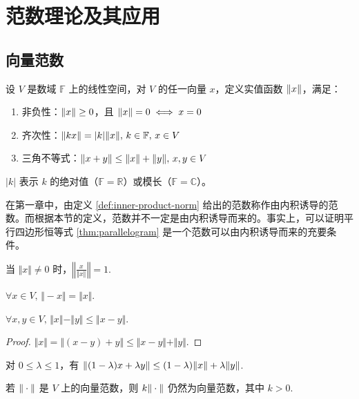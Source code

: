 \section{范数理论及其应用}

\subsection{向量范数}

\begin{definition}[向量范数]
设 $V$ 是数域 $\mathbb F$ 上的线性空间，对 $V$ 的任一向量 $x$，定义实值函数 $\Vert x\Vert$，满足：
\begin{enumerate}
    \item 非负性：$\Vert x\Vert\geq0$，且 $\Vert x\Vert=0\iff x=0$
    \item 齐次性：$\Vert kx\Vert=|k|\Vert x\Vert,\,k\in \mathbb F,\,x\in V$
    \item 三角不等式：$\Vert x+y\Vert\leq\Vert x\Vert+\Vert y\Vert,\,x,y\in V$
\end{enumerate}
\end{definition}
\begin{com}
$|k|$ 表示 $k$ 的绝对值（$\mathbb F=\mathbb R$）或模长（$\mathbb F=\mathbb C$）。
\end{com}

\begin{remark}
在第一章中，由定义 \ref{def:inner-product-norm} 给出的范数称作由内积诱导的范数。而根据本节的定义，范数并不一定是由内积诱导而来的。事实上，可以证明平行四边形恒等式 \ref{thm:parallelogram} 是一个范数可以由内积诱导而来的充要条件。
\end{remark}

\begin{property}
当 $\Vert x\Vert\neq0$ 时，$\left\Vert\frac{x}{\Vert x\Vert}\right\Vert=1$.
\end{property}
\begin{property}
$\forall x\in V,\,\Vert -x\Vert=\Vert x\Vert$.
\end{property}
\begin{property}
$\forall x,y\in V,\,\Vert x\Vert-\Vert y\Vert\leq\Vert x-y\Vert$.
\end{property}
\begin{proof}
$\Vert x\Vert=\Vert (x-y)+y\Vert\leq\Vert x-y\Vert+\Vert y\Vert$.
\end{proof}
\begin{property}[范数是凸函数]
对 $0\leq\lambda\leq1$，有 $\Vert(1-\lambda)x+\lambda y\Vert\leq(1-\lambda)\Vert x\Vert+\lambda\Vert y\Vert$.
\end{property}
\begin{property}[范数的乘法]
若 $\Vert\cdot\Vert$ 是 $V$ 上的向量范数，则 $k\Vert\cdot\Vert$ 仍然为向量范数，其中 $k>0$.
\end{property}

